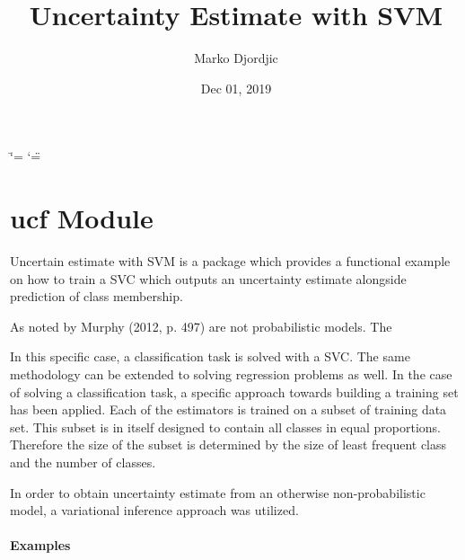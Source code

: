 \documentclass[a4paper,10pt,english]{sphinxmanual}
\title{Uncertainty Estimate with SVM}
\date{Dec 01, 2019}
\author{Marko Djordjic}
\begin{document}
\ifdefined\shorthandoff
  \ifnum\catcode`\=\string=\active\shorthandoff{=}\fi
  \ifnum\catcode`\"=\active{}\fi
\fi

\pagestyle{empty}
\sphinxmaketitle
\pagestyle{plain}
\sphinxtableofcontents
\pagestyle{normal}
\label{\detokenize{index::doc}}



\chapter{ucf Module}
\label{\detokenize{index:module-ucf}}\label{\detokenize{index:ucf-module}}
Uncertain estimate with SVM is a package which provides a functional
example on how to train a SVC which outputs an uncertainty estimate
alongside prediction of class membership.

As noted by Murphy (2012, p. 497) are not probabilistic models. The

In this specific case, a classification task is solved with a SVC. The
same methodology can be extended to solving regression problems as well.
In the case of solving a classification task, a specific approach towards
building a training set has been applied. Each of the estimators is trained
on a subset of training data set. This subset is in itself designed to
contain all classes in equal proportions. Therefore the size of the subset
is determined by the size of least frequent class and the number of classes.

In order to obtain uncertainty estimate from an otherwise non-probabilistic
model, a variational inference approach was utilized.
\subsubsection*{Examples}
\end{document}
